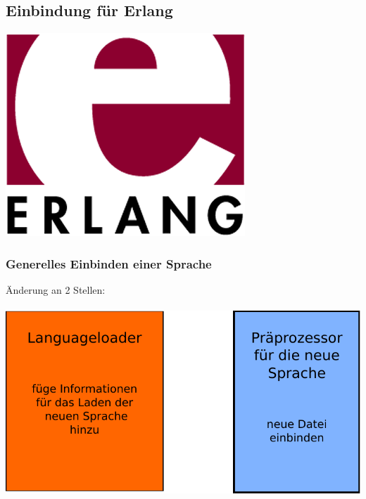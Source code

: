 \subsection{Einbindung für Erlang}

\begin{frame}
\begin{center}
\includegraphics[scale=0.5]{erlang/pics/erlang.png}
\end{center}
\end{frame}

\begin{frame}
  \frametitle{Generelles Einbinden einer Sprache}
  \begin{center}
    Änderung an 2 Stellen:\\$~$\\
    \includegraphics[scale=0.70]{erlang/pics/Spracheinbindung}
  \end{center}
\end{frame}


